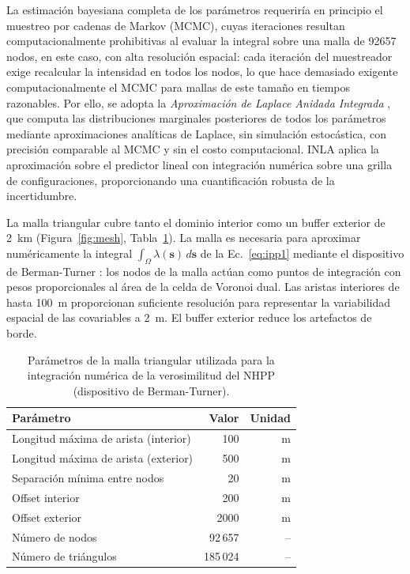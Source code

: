 \documentclass[12pt, a4paper]{article}
\begin{document}
La estimación bayesiana completa de los parámetros requeriría en principio el
muestreo por cadenas de Markov (MCMC), cuyas iteraciones resultan computacionalmente
prohibitivas al evaluar la integral sobre una malla de \num{92657} nodos, en este caso, con alta
resolución espacial: cada iteración del muestreador exige recalcular la intensidad
en todos los nodos, lo que hace demasiado exigente computacionalmente el MCMC para mallas de este tamaño en
tiempos razonables. Por ello, se adopta la \emph{Aproximación de Laplace Anidada
Integrada} \citep[INLA;][]{rue2009, rue2017}, que computa las distribuciones
marginales posteriores de todos los parámetros mediante aproximaciones analíticas
de Laplace, sin simulación estocástica, con precisión comparable al MCMC y sin el costo computacional. INLA aplica la aproximación sobre el predictor
lineal con integración numérica sobre una grilla de configuraciones, proporcionando una cuantificación robusta de la incertidumbre.

La malla triangular cubre tanto el
dominio interior como un buffer exterior de \SI{2}{km} (Figura~\ref{fig:mesh},
Tabla~\ref{tab:mesh}). La malla es necesaria para aproximar numéricamente la
integral $\int_\Omega \lambda(\mathbf{s})\,d\mathbf{s}$ de la Ec.~\eqref{eq:ipp1}
mediante el dispositivo de Berman-Turner
\citep{diggle2013}: los nodos de la malla actúan como puntos de integración con
pesos proporcionales al área de la celda de Voronoi dual. Las aristas interiores
de hasta \SI{100}{m} proporcionan suficiente resolución para representar la
variabilidad espacial de las covariables a \SI{2}{m}. El buffer exterior reduce los artefactos
de borde.

\begin{table}[H]
  \centering
  \caption{Parámetros de la malla triangular utilizada para la integración
           numérica de la verosimilitud del NHPP (dispositivo de Berman-Turner).}
  \label{tab:mesh}
  \begin{tabular}{lrr}
    \toprule
    Parámetro & Valor & Unidad \\
    \midrule
    Longitud máxima de arista (interior)  & 100  & m \\
    Longitud máxima de arista (exterior)  & 500  & m \\
    Separación mínima entre nodos         & 20   & m \\
    Offset interior                       & 200  & m \\
    Offset exterior                       & 2000 & m \\
    Número de nodos                       & 92\,657  & -- \\
    Número de triángulos                  & 185\,024 & -- \\
    \bottomrule
  \end{tabular}
\end{table}
\end{document}

